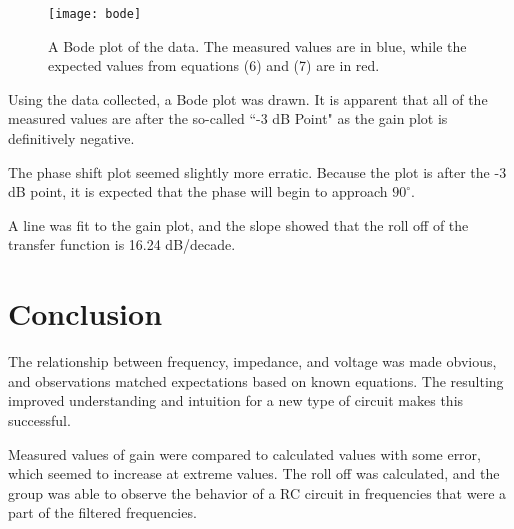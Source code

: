\documentclass[twocolumn, amsmath]{revtex4}
\begin{document}
\begin{figure}[h]
    \texttt{[image: bode]}
    \caption{A Bode plot of the data. The measured values are in blue, while the expected values from equations (6) and (7) are in red.}
\end{figure}

Using the data collected, a Bode plot was drawn. It is apparent that all of the measured values are after the so-called ``-3 dB Point" as the gain plot is definitively negative.

The phase shift plot seemed slightly more erratic. Because the plot is after the -3 dB point, it is expected that the phase will begin to approach $90^\circ$.

A line was fit to the gain plot, and the slope showed that the roll off of the transfer function is 16.24 dB/decade. 


\section{Conclusion}
The relationship between frequency, impedance, and voltage was made obvious, and observations matched expectations based on known equations. The resulting improved understanding and intuition for a new type of circuit makes this successful.

Measured values of gain were compared to calculated values with some error, which seemed to increase at extreme values. The roll off was calculated, and the group was able to observe the behavior of a RC circuit in frequencies that were a part of the filtered frequencies.
\end{document}
